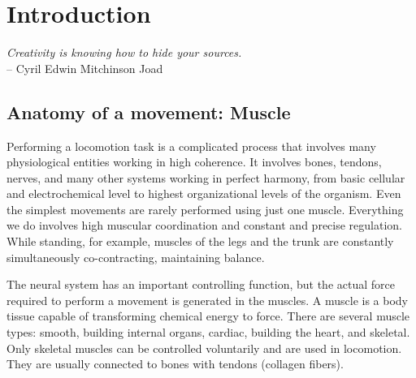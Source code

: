 

\chapter{Introduction}

\narrowlinespacing
\begin{myquote}
\begin{flushright}
\textit{Creativity is knowing how to hide your sources.} \\-- Cyril Edwin Mitchinson Joad
\end{flushright}
\end{myquote}
\normallinespacing

\section{Anatomy of a movement: Muscle} %
Performing a locomotion task is a complicated process that involves many physiological entities working in high coherence. It involves bones, tendons, nerves, and many other systems working in perfect harmony, from basic cellular and electrochemical level to highest organizational levels of the organism. Even the simplest movements are rarely performed using just one muscle. Everything we do involves high muscular coordination and constant and precise regulation. While standing, for example, muscles of the legs and the trunk are constantly simultaneously co-contracting, maintaining balance.  

The neural system has an important controlling function, but the actual force required to perform a movement is generated in the muscles. A muscle is a body tissue capable of transforming chemical energy to force. There are several muscle types: smooth, building internal organs, cardiac, building the heart, and skeletal. Only skeletal muscles can be controlled voluntarily and are used in locomotion. They are usually connected to bones with tendons (collagen fibers).

